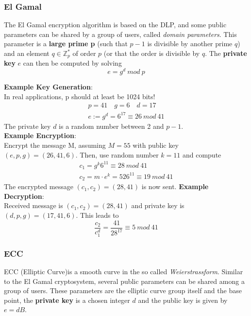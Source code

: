 \documentclass[a4paper, 10 pt, conference]{ieeeconf}
\begin{document}
\vspace{0.5cm}
\subsubsection{\textbf{El Gamal}}

The El Gamal encryption algorithm is based on the DLP, and some public parameters can be shared by a group of users, called \emph{domain parameters}. This parameter is a \textbf{large prime p} (such that $p-1$ is divisible by another prime $q$) and an element $q \in \mathbb{Z}^{*}_{p}$ of order $p$ (or that the order is divisible by $q$. The \textbf{private key} $e$ can then be computed by solving
\begin{equation*}
e = g^{d} \ mod \ p
\end{equation*}

\textbf{Example Key Generation}: \\
In real applications, p should at least be 1024 bits!
\begin{align*}
p = 41 \quad g = 6 \quad d = 17 \\
e := g^{d} = 6^{17} \equiv 26 \ mod \ 41
\end{align*}
The private key $d$ is a random number between 2 and $p-1$. \\
\textbf{Example Encryption}: \\
Encrypt the message M, assuming $M=55$ with public key $(e,p,g) = (26,41,6)$. Then, use random number $k=11$ and compute 
\begin{align*}
c_1 = g^{k} 6^{11} \equiv 28 \ mod \ 41 \\
c_2 = m\cdot e^{k} = 526^{11} \equiv 19 \ mod \ 41
\end{align*}
The encrypted message $(c_1,c_2) = (28,41)$ is now sent. 
\textbf{Example Decryption}: \\
Received message is $(c_1,c_2) = (28,41)$ and private key is $(d,p,g) = (17,41,6)$. This leads to 
\begin{equation*}
\frac{c_2}{c_1^{d}} = \frac{41}{28^{17}} \equiv 5 \ mod \ 41
\end{equation*}

\subsubsection{\textbf{ECC}}
ECC (Elliptic Curve)is a smooth curve in the so called \emph{Weierstrassform}. 
Similar to the El Gamal cryptosystem, several public parameters can be shared among a group of users.
These parameters are the elliptic curve group itself and the base point, the \textbf{private key} is a chosen integer $d$ and the public key is given by $e=dB$. 
\end{document}
